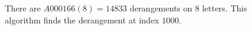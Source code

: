 \begin{figure}
\begin{tabular}{|l|r|l|c|l|}
\end{tabular}
\caption{There are $A000166(8) = 14833$ derangements on $8$ letters.
This algorithm finds the derangement at index $1000$.}
\end{figure}

